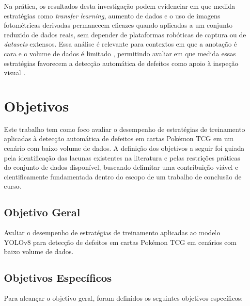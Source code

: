 \documentclass[
    12pt,                %
    openright,           %
    oneside,             %
    a4paper,             %
    english,             %
    brazil               %
]{abntex2}
\begin{document}
Na prática, os resultados desta investigação podem evidenciar em que 
medida estratégias como \textit{transfer learning}, aumento de dados 
e o uso de imagens fotométricas derivadas permanecem eficazes quando 
aplicadas a um conjunto reduzido de dados reais, sem depender de 
plataformas robóticas de captura ou de \textit{datasets} extensos. 
Essa análise é relevante para contextos em que a anotação é cara e o 
volume de dados é limitado \cite{Situ2023, Chen2021}, permitindo 
avaliar em que medida essas estratégias favorecem a detecção 
automática de defeitos como apoio à inspeção visual \cite{Nahar2025}.

\section{Objetivos}
\label{sec:objetivos}


Este trabalho tem como foco avaliar o desempenho de estratégias de 
treinamento aplicadas à detecção automática de defeitos em cartas 
Pokémon TCG em um cenário com baixo volume de dados. A definição dos 
objetivos a seguir foi guiada pela identificação das lacunas existentes 
na literatura e pelas restrições práticas do conjunto de dados 
disponível, buscando delimitar uma contribuição viável e 
cientificamente fundamentada dentro do escopo de um trabalho de 
conclusão de curso.

\subsection{Objetivo Geral}

Avaliar o desempenho de estratégias de treinamento aplicadas ao modelo YOLOv8 para detecção de defeitos em cartas Pokémon TCG em cenários com baixo volume de dados.

\subsection{Objetivos Específicos}

Para alcançar o objetivo geral, foram definidos os seguintes objetivos específicos:
\end{document}
